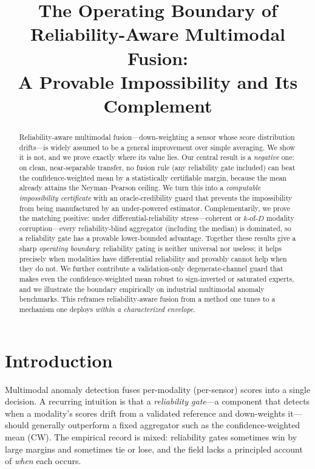 \documentclass[11pt]{article}
\title{\textbf{The Operating Boundary of Reliability-Aware Multimodal Fusion:\\
A Provable Impossibility and Its Complement}}
\author{}
\date{}
\begin{document}
\maketitle

\begin{abstract}
Reliability-aware multimodal fusion---down-weighting a sensor whose score
distribution drifts---is widely assumed to be a general improvement over simple
averaging. We show it is not, and we prove exactly where its value lies. Our
central result is a \emph{negative} one: on clean, near-separable transfer, no
fusion rule (any reliability gate included) can beat the confidence-weighted mean
by a statistically certifiable margin, because the mean already attains the
Neyman--Pearson ceiling. We turn this into a \emph{computable impossibility
certificate} with an oracle-credibility guard that prevents the impossibility from
being manufactured by an under-powered estimator. Complementarily, we prove the
matching positive: under differential-reliability stress---coherent or
$k$-of-$D$ modality corruption---every reliability-blind aggregator (including the
median) is dominated, so a reliability gate has a provable lower-bounded advantage.
Together these results give a sharp \emph{operating boundary}: reliability gating
is neither universal nor useless; it helps precisely when modalities have
differential reliability and provably cannot help when they do not. We further
contribute a validation-only degenerate-channel guard that makes even the
confidence-weighted mean robust to sign-inverted or saturated experts, and we
illustrate the boundary empirically on industrial multimodal anomaly benchmarks.
This reframes reliability-aware fusion from a method one tunes to a mechanism one
deploys \emph{within a characterized envelope}.
\end{abstract}

\section{Introduction}
Multimodal anomaly detection fuses per-modality (per-sensor) scores into a single
decision. A recurring intuition is that a \emph{reliability gate}---a component
that detects when a modality's scores drift from a validated reference and
down-weights it---should generally outperform a fixed aggregator such as the
confidence-weighted mean (CW). The empirical record is mixed: reliability gates
sometimes win by large margins and sometimes tie or lose, and the field lacks a
principled account of \emph{when} each occurs.
\end{document}
